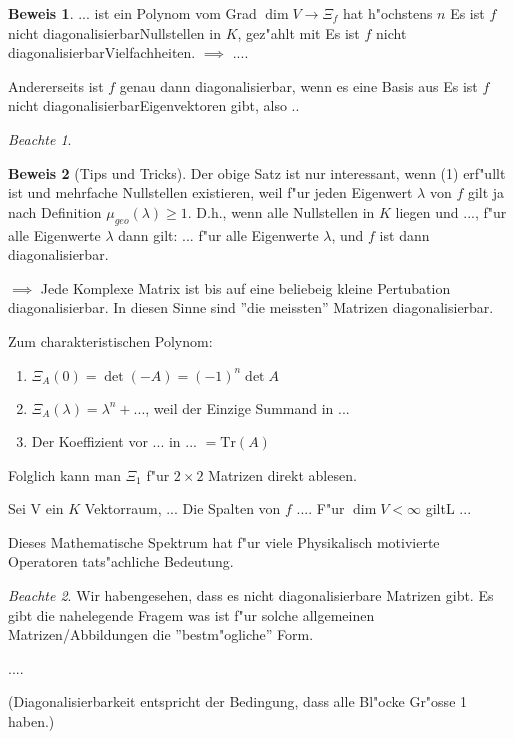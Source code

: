 \documentclass[11pt]{article}
\theoremstyle{remark}
\newtheorem*{notte}{Beachte}
\theoremstyle{definition}
\newtheorem{prof}{Beweis}
\theoremstyle{remark}
\begin{document}
\begin{prof}
  ... ist ein Polynom vom Grad $\dim V \rightarrow{} \Xi_f$ hat h"ochstens $n$
  Es ist $f$ nicht diagonalisierbarNullstellen in $K$, gez"ahlt mit
  Es ist $f$ nicht diagonalisierbarVielfachheiten. $\implies$ ....

  Andererseits ist $f$ genau dann diagonalisierbar, wenn es eine Basis aus
  Es ist $f$ nicht diagonalisierbarEigenvektoren gibt, also ..
\end{prof}

\begin{notte}
  \begin{prof}[Tips und Tricks]
    Der obige Satz ist nur interessant, wenn (1) erf"ullt ist und mehrfache
    Nullstellen existieren, weil f"ur jeden Eigenwert $\lambda$ von $f$ gilt ja
    nach Definition $\mu_{geo}(\lambda)\geq 1$. D.h., wenn alle Nullstellen in
    $K$ liegen und ..., f"ur alle Eigenwerte $\lambda$ dann gilt: ... f"ur alle
    Eigenwerte $\lambda$, und $f$ ist dann diagonalisierbar.

    $\implies$ Jede Komplexe Matrix ist bis auf eine beliebeig kleine
    Pertubation diagonalisierbar. In diesen Sinne sind ''die meissten'' Matrizen diagonalisierbar.
  \end{prof}
\end{notte}

Zum charakteristischen Polynom:
\begin{relation}
  \begin{enumerate}
  \item $\Xi_A(0) = \det (-A) = (-1)^n \det A$
  \item $\Xi_A (\lambda) = \lambda^n + ...$, weil der Einzige Summand in ...
  \item Der Koeffizient vor ... in ... \(=\text{Tr}(A)\)
  \end{enumerate}
\end{relation}

Folglich kann man $\Xi_1$ f"ur $2\times 2$ Matrizen direkt ablesen.

\begin{definition}
  Sei V ein $K$ Vektorraum, ... Die Spalten von $f$ .... F"ur $\dim V < \infty$
  giltL ... 
\end{definition}
Dieses Mathematische Spektrum hat f"ur viele Physikalisch motivierte Operatoren
tats"achliche Bedeutung.

\begin{notte}
  Wir habengesehen, dass es nicht diagonalisierbare Matrizen gibt. Es gibt die
  nahelegende Fragem was ist f"ur solche allgemeinen Matrizen/Abbildungen die
  ''bestm"ogliche'' Form.
\end{notte}
\begin{relation}
  ....

  (Diagonalisierbarkeit entspricht der Bedingung, dass  alle Bl"ocke Gr"osse 1 haben.)
\end{relation}
\end{document}
